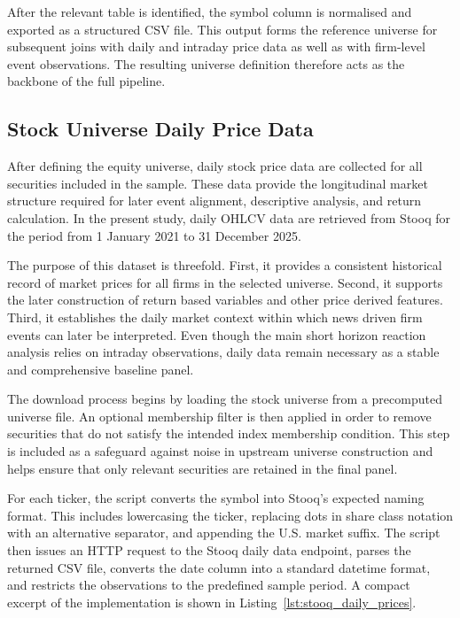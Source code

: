 After the relevant table is identified, the symbol column is normalised and exported as a structured CSV file. This output forms the reference universe for subsequent joins with daily and intraday price data as well as with firm-level event observations. The resulting universe definition therefore acts as the backbone of the full pipeline.

\subsection{Stock Universe Daily Price Data}

After defining the equity universe, daily stock price data are collected for all securities included in the sample. These data provide the longitudinal market structure required for later event alignment, descriptive analysis, and return calculation. In the present study, daily OHLCV data are retrieved from Stooq for the period from 1 January 2021 to 31 December 2025.

The purpose of this dataset is threefold. First, it provides a consistent historical record of market prices for all firms in the selected universe. Second, it supports the later construction of return based variables and other price derived features. Third, it establishes the daily market context within which news driven firm events can later be interpreted. Even though the main short horizon reaction analysis relies on intraday observations, daily data remain necessary as a stable and comprehensive baseline panel.

The download process begins by loading the stock universe from a precomputed universe file. An optional membership filter is then applied in order to remove securities that do not satisfy the intended index membership condition. This step is included as a safeguard against noise in upstream universe construction and helps ensure that only relevant securities are retained in the final panel.

For each ticker, the script converts the symbol into Stooq's expected naming format. This includes lowercasing the ticker, replacing dots in share class notation with an alternative separator, and appending the U.S. market suffix. The script then issues an HTTP request to the Stooq daily data endpoint, parses the returned CSV file, converts the date column into a standard datetime format, and restricts the observations to the predefined sample period. A compact excerpt of the implementation is shown in Listing~\ref{lst:stooq_daily_prices}.

